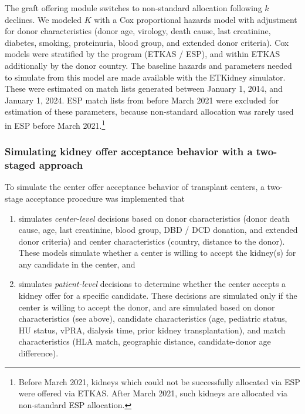 \documentclass[11pt,twoside,]{book}
\let\rmarkdownfootnote\footnote%
\def\footnote{\protect\rmarkdownfootnote}
\begin{document}
The graft offering module switches to non-standard allocation following \(k\)
declines. We modeled \(K\) with a Cox proportional hazards model with
adjustment for donor characteristics (donor age, virology, death cause,
last creatinine, diabetes, smoking, proteinuria, blood group, and
extended donor criteria). Cox models were stratified by the program
(ETKAS / ESP), and within ETKAS additionally by the donor country.
The baseline hazards and parameters needed to simulate from this model
are made available with the ETKidney simulator. These were estimated
on match lists generated between January 1, 2014, and January 1, 2024. ESP match lists
from before March 2021 were excluded for estimation of these parameters,
because non-standard allocation was rarely used in ESP before March 2021.\footnote{
  Before March 2021, kidneys which could not be successfully allocated via ESP
  were offered via ETKAS. After March 2021, such kidneys are allocated via non-standard
  ESP allocation.}

\subsubsection{Simulating kidney offer acceptance behavior with a two-staged approach}\label{sec:etkidneytwostage}

To simulate the center offer acceptance behavior of transplant centers,
a two-stage acceptance procedure was implemented that

\begin{enumerate}
\def\labelenumi{\arabic{enumi}.}
\item
  simulates \emph{center-level} decisions based on donor characteristics
  (donor death cause, age, last creatinine, blood group, DBD / DCD
  donation, and extended donor criteria) and
  center characteristics (country, distance to the donor). These
  models simulate whether a center is willing to accept the kidney(s)
  for any candidate in the center, and
\item
  simulates \emph{patient-level} decisions to determine whether the center
  accepts a kidney offer for a specific candidate. These decisions are
  simulated only if the center is willing to accept the donor, and are
  simulated based on donor characteristics (see above), candidate
  characteristics (age, pediatric status, HU status, vPRA, dialysis
  time, prior kidney transplantation), and match characteristics (HLA
  match, geographic distance, candidate-donor age difference).
\end{enumerate}
\end{document}
